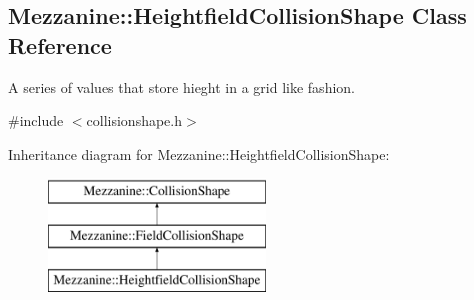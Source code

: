 \hypertarget{classMezzanine_1_1HeightfieldCollisionShape}{
\subsection{Mezzanine::HeightfieldCollisionShape Class Reference}
\label{classMezzanine_1_1HeightfieldCollisionShape}
}


A series of values that store hieght in a grid like fashion.  




{\ttfamily \#include $<$collisionshape.h$>$}

Inheritance diagram for Mezzanine::HeightfieldCollisionShape:\begin{figure}[H]
\begin{center}
\leavevmode
\includegraphics[height=3.000000cm]{classMezzanine_1_1HeightfieldCollisionShape}
\end{center}
\end{figure}
